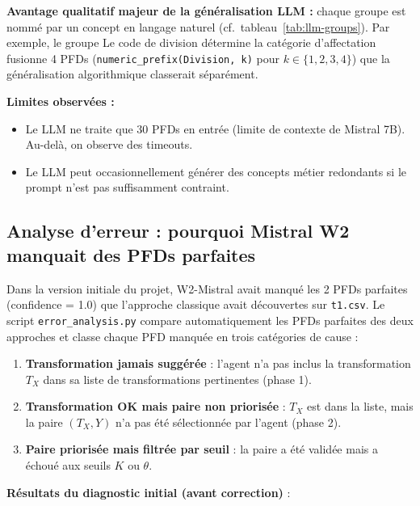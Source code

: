 \documentclass[12pt,a4paper]{article}
\begin{document}
\textbf{Avantage qualitatif majeur de la g\'{e}n\'{e}ralisation LLM :} chaque groupe est nomm\'{e} par un concept en langage naturel (cf.\ tableau~\ref{tab:llm-groups}). Par exemple, le groupe \og{}Le code de division d\'{e}termine la cat\'{e}gorie d'affectation\fg{} fusionne 4 PFDs (\texttt{numeric\_prefix(Division, k)} pour $k \in \{1, 2, 3, 4\}$) que la g\'{e}n\'{e}ralisation algorithmique classerait s\'{e}par\'{e}ment.

\textbf{Limites observ\'{e}es :}
\begin{itemize}
    \item Le LLM ne traite que 30 PFDs en entr\'{e}e (limite de contexte de Mistral 7B). Au-del\`{a}, on observe des timeouts.
    \item Le LLM peut occasionnellement g\'{e}n\'{e}rer des concepts m\'{e}tier redondants si le prompt n'est pas suffisamment contraint.
\end{itemize}

\subsection{Analyse d'erreur : pourquoi Mistral W2 manquait des PFDs parfaites}
\label{subsec:err-analysis}

Dans la version initiale du projet, W2-Mistral avait manqu\'{e} les 2 PFDs parfaites (confidence = 1.0) que l'approche classique avait d\'{e}couvertes sur \texttt{t1.csv}. Le script \texttt{error\_analysis.py} compare automatiquement les PFDs parfaites des deux approches et classe chaque PFD manqu\'{e}e en trois cat\'{e}gories de cause :

\begin{enumerate}
    \item \textbf{Transformation jamais sugg\'{e}r\'{e}e} : l'agent n'a pas inclus la transformation $T_X$ dans sa liste de transformations pertinentes (phase 1).
    \item \textbf{Transformation OK mais paire non prioris\'{e}e} : $T_X$ est dans la liste, mais la paire $(T_X, Y)$ n'a pas \'{e}t\'{e} s\'{e}lectionn\'{e}e par l'agent (phase 2).
    \item \textbf{Paire prioris\'{e}e mais filtr\'{e}e par seuil} : la paire a \'{e}t\'{e} valid\'{e}e mais a \'{e}chou\'{e} aux seuils $K$ ou $\theta$.
\end{enumerate}

\textbf{R\'{e}sultats du diagnostic initial (avant correction)} :
\end{document}
